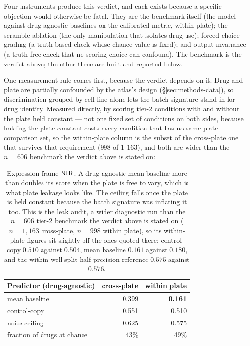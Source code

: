 Four instruments produce this verdict, and each exists because a specific objection would otherwise
be fatal. They are the benchmark itself (the model against drug-agnostic baselines on the
calibrated metric, within plate); the scramble ablation (the only manipulation that isolates drug
use); forced-choice grading (a truth-based check whose chance value is fixed); and output
invariance (a truth-free check that no scoring choice can confound). The benchmark is the verdict
above; the other three are built and reported below.

One measurement rule comes first, because the verdict depends on it. Drug and plate are partially
confounded by the atlas's design (\S\ref{sec:methods-data}), so discrimination grouped by cell line
alone lets the batch signature stand in for drug identity. Measured directly, by scoring tier-2
conditions with and without the plate held constant --- not one fixed set of conditions on both
sides, because holding the plate constant costs every condition that has no same-plate comparison
set, so the within-plate column is the subset of the cross-plate one that survives that requirement
($998$ of $1{,}163$), and both are wider than the $n = 606$ benchmark the verdict above is stated
on:

\begin{table}[htbp]
\centering
\begin{tabular}{lrr}
\toprule
Predictor (drug-agnostic) & cross-plate & within plate \\
\midrule
mean baseline & 0.399 & \textbf{0.161} \\
control-copy & 0.551 & 0.510 \\
\midrule
noise ceiling & 0.625 & 0.575 \\
fraction of drugs at chance & 43\% & 49\% \\
\bottomrule
\end{tabular}
\caption{Expression-frame $\textrm{NIR}$. A drug-agnostic mean baseline more than doubles its score when the
plate is free to vary, which is what plate leakage looks like. The ceiling falls once the plate is
held constant because the batch signature was inflating it too. This is the leak audit, a wider
diagnostic run than the $n = 606$ tier-2 benchmark the verdict above is stated on ($n = 1{,}163$
cross-plate, $n = 998$ within plate), so its within-plate figures sit slightly off the ones quoted
there: control-copy $0.510$ against $0.504$, mean baseline $0.161$ against $0.180$, and the
within-well split-half precision reference $0.575$ against $0.576$.}
\label{tab:plateleak}
\end{table}

